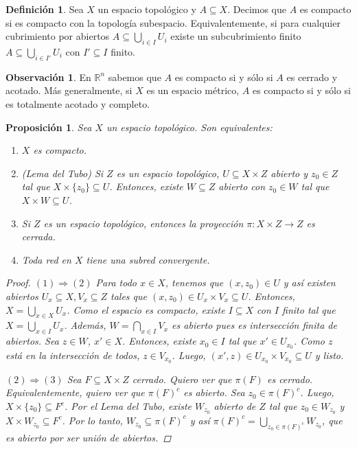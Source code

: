 \documentclass[12pt]{book}
\newtheorem{prop}[teo]{Proposición}
\theoremstyle{definition}
\newtheorem{obs}[teo]{Observación}
\newtheorem{defn}[teo]{Definición}
\newcommand{\RR}{\mathbb{R}}      %
\begin{document}
\begin{defn}
Sea $X$ un espacio topológico y $A\subseteq X$. Decimos que $A$ es compacto si es compacto con la topología subespacio. Equivalentemente, si para cualquier cubrimiento por abiertos $A\subseteq \displaystyle\bigcup_{i\in I}U_i$ existe un subcubrimiento finito $A\subseteq\displaystyle\bigcup_{i\in I'} U_i$ con $I'\subseteq I$ finito.
\end{defn}

\begin{obs}
En $\RR^n$ sabemos que $A$ es compacto si y sólo si $A$ es cerrado y acotado. Más generalmente, si $X$ es un espacio métrico, $A$ es compacto si y sólo si es totalmente acotado y completo.
\end{obs}

\begin{prop}
Sea $X$ un espacio topológico. Son equivalentes:
\begin{enumerate}
\item $X$ es compacto.
\item (Lema del Tubo) Si $Z$ es un espacio topológico, $U\subseteq X\times Z$ abierto y $z_0\in Z$ tal que $X\times \{z_0\}\subseteq U$. Entonces, existe $W\subseteq Z$ abierto con $z_0\in W$ tal que $X\times W\subseteq U$.
\item Si $Z$ es un espacio topológico, entonces la proyección $\pi:X\times Z\to Z$ es cerrada.
\item Toda red en $X$ tiene una subred convergente.
\end{enumerate}
\begin{proof}

$(1)\Longrightarrow (2)$ Para todo $x\in X$, tenemos que $(x,z_0)\in U$ y así existen abiertos $U_x\subseteq X, V_x\subseteq Z$ tales que $(x,z_0)\in U_x\times V_x\subseteq U$. Entonces, $X = \displaystyle\bigcup_{x\in X} U_x$. Como el espacio es compacto, existe $I\subseteq X$ con $I$ finito tal que $X = \displaystyle\bigcup_{x\in I} U_x$. Además, $W = \displaystyle\bigcap_{x\in I} V_x$ es abierto pues es intersección finita de abiertos. Sea $z\in W$, $x'\in X$. Entonces, existe $x_0\in I$ tal que $x'\in U_{x_0}$. Como $z$ está en la intersección de todos, $z\in V_{x_0}$. Luego, $(x',z)\in U_{x_0}\times V_{x_0}\subseteq U$ y listo.

$(2)\Longrightarrow (3)$ Sea $F\subseteq X\times Z$ cerrado. Quiero ver que $\pi(F)$ es cerrado. Equivalentemente, quiero ver que $\pi(F)^c$ es abierto. Sea $z_0\in \pi(F)^c$. Luego, $X\times\{z_0\}\subseteq F^c$. Por el Lema del Tubo, existe $W_{z_0}$ abierto de $Z$ tal que $z_0\in W_{z_0}$ y $X\times W_{z_0}\subseteq F^c$. Por lo tanto, $W_{z_0}\subseteq \pi(F)^c$ y así $\pi(F)^c = \displaystyle\bigcup_{z_0\in\pi(F)^c} W_{z_0}$, que es abierto por ser unión de abiertos.


\end{proof}
\end{prop}
\end{document}
